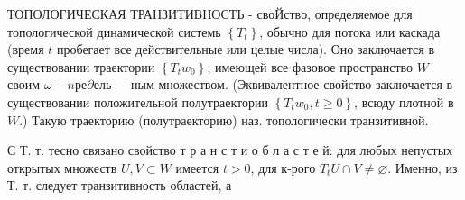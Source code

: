 \documentclass[10pt]{article}
\begin{document}
ТОПОЛОГИЧЕСКАЯ ТРАНЗИТИВНОСТЬ - своЙство, определяемое для топологической динамической системь $\left\{T_{t}\right\}$, обычно для потока или каскада (время $t$ пробегает все действительные или целые числа). Оно заключается в существовании траектории $\left\{T_{t} w_{0}\right\}$, имеющей все фазовое пространство $W$ своим $\omega-n р е \partial е л ь-$ ным множеством. (Эквивалентное свойство заключается в существовании положительной полутраектории $\left\{T_{t} w_{0}, t \geqslant 0\right\}$, всюду плотной в $W$.) Такую траекторию (полутраекторию) наз. топологически транзитивной.



С Т. т. тесно связано свойство т р а н с т и о б л а с т е й: для любых непустых открытых множеств $U, V \subset W$ имеется $t>0$, для к-рого $T_{t} U \cap V \neq \varnothing$. Именно, из Т. т. следует транзитивность областей, а
\end{document}
